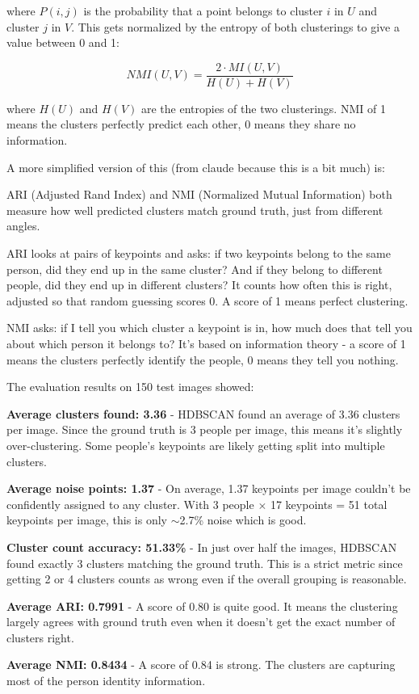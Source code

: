 where $P(i, j)$ is the probability that a point belongs to cluster $i$ in $U$ and cluster $j$ in $V$.
This gets normalized by the entropy of both clusterings to give a value between 0 and 1:

\begin{equation}
NMI(U, V) = \frac{2 \cdot MI(U, V)}{H(U) + H(V)}
\label{eq:nmi}
\end{equation}

where $H(U)$ and $H(V)$ are the entropies of the two clusterings.
NMI of 1 means the clusters perfectly predict each other, 0 means they share no information.

A more simplified version of this (from claude because this is a bit much) is:

ARI (Adjusted Rand Index) and NMI (Normalized Mutual Information) both measure
how well predicted clusters match ground truth, just from different angles.

ARI looks at pairs of keypoints and asks: if two keypoints belong to the same
person, did they end up in the same cluster? And if they belong to different
people, did they end up in different clusters? It counts how often this is 
right, adjusted so that random guessing scores 0. A score of 1 means perfect
clustering.

NMI asks: if I tell you which cluster a keypoint is in, how much does that tell
you about which person it belongs to? It's based on information theory - a
score of 1 means the clusters perfectly identify the people, 0 means they tell
you nothing.

The evaluation results on 150 test images showed:

\begin{compactitem} 
  \item \textbf{Average clusters found: 3.36} - HDBSCAN found
    an average of 3.36 clusters per image. Since the ground truth is 3 people per
    image, this means it's slightly over-clustering. Some people's keypoints are
    likely getting split into multiple clusters.

  \item \textbf{Average noise points: 1.37} - On average, 1.37 keypoints per
    image couldn't be confidently assigned to any cluster. With 3 people $\times$
    17 keypoints = 51 total keypoints per image, this is only $\sim$2.7\% noise
    which is good.

    \item \textbf{Cluster count accuracy: 51.33\%} - In just over half the images,
      HDBSCAN found exactly 3 clusters matching the ground truth. This is a strict
      metric since getting 2 or 4 clusters counts as wrong even if the overall
      grouping is reasonable.

    \item \textbf{Average ARI: 0.7991} - A score of 0.80 is quite good. It means
      the clustering largely agrees with ground truth even when it doesn't get the
      exact number of clusters right.

    \item \textbf{Average NMI: 0.8434} - A score of 0.84 is strong. The clusters
      are capturing most of the person identity information. 
\end{compactitem}

